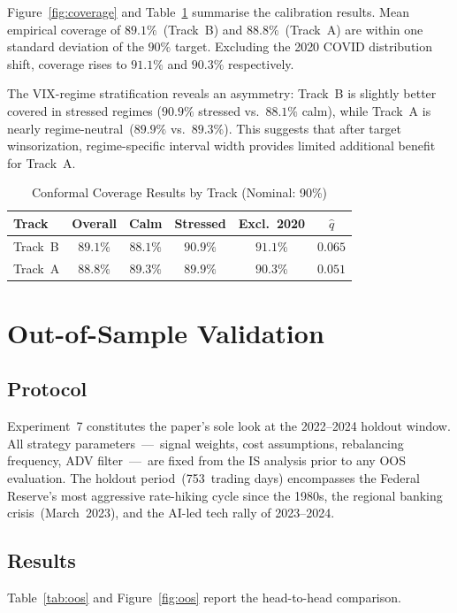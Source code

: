 \documentclass[journal]{IEEEtran}
\begin{document}
Figure~\ref{fig:coverage} and Table~\ref{tab:coverage} summarise
the calibration results.
Mean empirical coverage of $89.1\%$~(Track~B) and $88.8\%$~(Track~A)
are within one standard deviation of the $90\%$ target.
Excluding the 2020 COVID distribution shift, coverage rises to
$91.1\%$ and $90.3\%$ respectively.

The VIX-regime stratification reveals an asymmetry: Track~B is
slightly better covered in stressed regimes
($90.9\%$ stressed vs.\ $88.1\%$ calm), while Track~A is
nearly regime-neutral~($89.9\%$ vs.\ $89.3\%$).
This suggests that after target winsorization, regime-specific
interval width provides limited additional benefit for Track~A.

\begin{table}[t]
\centering
\caption{Conformal Coverage Results by Track (Nominal: 90\%)}
\label{tab:coverage}
\begin{tabular}{lccccc}
\toprule
Track & Overall & Calm & Stressed & Excl.\ 2020 & $\hat q$ \\
\midrule
Track~B & $89.1\%$ & $88.1\%$ & $90.9\%$ & $91.1\%$ & $0.065$ \\
Track~A & $88.8\%$ & $89.3\%$ & $89.9\%$ & $90.3\%$ & $0.051$ \\
\bottomrule
\end{tabular}
\end{table}

\section{Out-of-Sample Validation}
\label{sec:oos}

\subsection{Protocol}
Experiment~7 constitutes the paper's sole look at the 2022--2024
holdout window.
All strategy parameters~---~signal weights, cost assumptions,
rebalancing frequency, ADV filter~---~are fixed from the IS analysis
prior to any OOS evaluation.
The holdout period~(753~trading days) encompasses the Federal
Reserve's most aggressive rate-hiking cycle since the 1980s, the
regional banking crisis~(March~2023), and the AI-led tech rally of
2023--2024.

\subsection{Results}
Table~\ref{tab:oos} and Figure~\ref{fig:oos} report the head-to-head
comparison.
\end{document}
